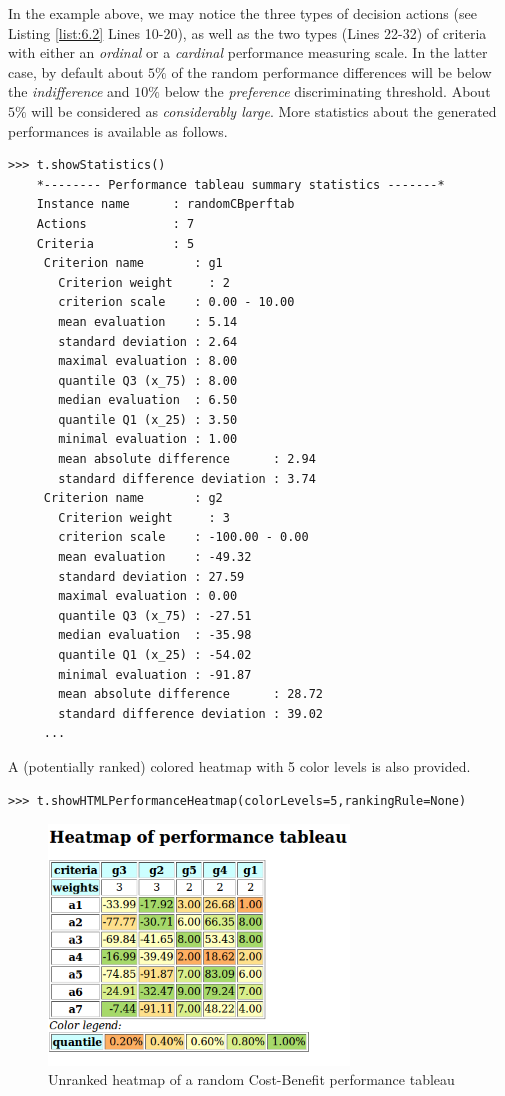 In the example above, we may notice the three types of decision actions (see Listing \ref{list:6.2} Lines 10-20), as well as the two types (Lines 22-32) of criteria with either an \emph{ordinal} or a \emph{cardinal} performance measuring scale. In the latter case, by default about $5\%$ of the random performance differences will be below the \emph{indifference} and $10\%$ below the \emph{preference} discriminating threshold. About $5\%$ will be considered as \emph{considerably large}. More statistics about the generated performances is available as follows.
\begin{lstlisting}
>>> t.showStatistics()
    *-------- Performance tableau summary statistics -------*
    Instance name      : randomCBperftab
    Actions            : 7
    Criteria           : 5
     Criterion name       : g1
       Criterion weight     : 2
       criterion scale    : 0.00 - 10.00
       mean evaluation    : 5.14
       standard deviation : 2.64
       maximal evaluation : 8.00
       quantile Q3 (x_75) : 8.00
       median evaluation  : 6.50
       quantile Q1 (x_25) : 3.50
       minimal evaluation : 1.00
       mean absolute difference      : 2.94
       standard difference deviation : 3.74
     Criterion name       : g2
       Criterion weight     : 3
       criterion scale    : -100.00 - 0.00
       mean evaluation    : -49.32
       standard deviation : 27.59
       maximal evaluation : 0.00
       quantile Q3 (x_75) : -27.51
       median evaluation  : -35.98
       quantile Q1 (x_25) : -54.02
       minimal evaluation : -91.87
       mean absolute difference      : 28.72
       standard difference deviation : 39.02
     ...
\end{lstlisting}

A (potentially ranked) colored heatmap with 5 color levels is also provided.
\begin{lstlisting}[basicstyle=\footnotesize]
   >>> t.showHTMLPerformanceHeatmap(colorLevels=5,rankingRule=None)
 \end{lstlisting}

 \begin{figure}[h]
\includegraphics[width=8cm]{Figures/randomCBHeatmap.png}
\caption{Unranked heatmap of a random Cost-Benefit performance tableau}
\label{fig:6.2}       %
\end{figure}
 
